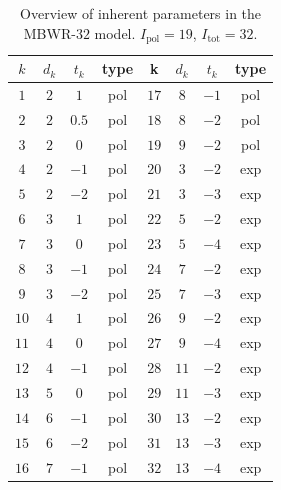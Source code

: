 \documentclass[internal,english]{sintefmemo2012}
\numberwithin{equation}{section}
\begin{document}
\begin{table}
  \label{MBWR32Terms}
  \centering
  \begin{tabular}{c c c c | c c c c }
    $k$		        & $d_k$		& $t_k$		& type		& k		 & $d_k$	  & $t_k$	    & type	       \\
    \hline
    $1$		        & $2$       	&$ 1$		& pol           & $17$	 & $8$       	  &$-1$		    & pol              \\
    $2$		        & $2$       	&$ 0.5$		&pol            & $18$	 & $8$       	  &$-2$		    & pol              \\
    $3$		        & $2$       	&$ 0$		&pol            & $19$	 & $9$       	  &$-2$		    & pol              \\
    $4$		        & $2$       	&$-1$ 		&pol            & $20$	 & $3$       	  &$-2$		    & exp              \\
    $5$		        & $2$       	&$-2$ 		&pol            & $21$	 & $3$       	  &$-3$		    & exp              \\
    $6$		        & $3$       	&$ 1$		&pol            & $22$	 & $5$       	  &$-2$		    & exp              \\
    $7$		        & $3$       	&$ 0$		&pol            & $23$	 & $5$       	  &$-4$		    & exp              \\
    $8$		        & $3$       	&$-1$		&pol            & $24$	 & $7$       	  &$-2$		    & exp              \\
    $9$		        & $3$       	&$-2$		&pol            & $25$	 & $7$       	  &$-3$		    & exp              \\
    $10$		& $4$       	&$ 1$		&pol            & $26$	 & $9$        	  &$-2$		    & exp              \\
    $11$		& $4$       	&$ 0$		&pol            & $27$   & $9$            &$-4$             & exp              \\
    $12$		& $4$       	&$-1$		&pol            & $28$   & $11$           &$-2$             & exp              \\
    $13$		& $5$       	&$ 0$		&pol            & $29$   & $11$           &$-3$             & exp              \\
    $14$		& $6$       	&$-1$		&pol            & $30$   & $13$           &$-2$             & exp              \\
    $15$		& $6$       	&$-2$		&pol            & $31$   & $13$           &$-3$             & exp              \\
    $16$		& $7$       	&$-1$		&pol            & $32$   & $13$           &$-4$             & exp              
  \end{tabular}
  \caption{Overview of inherent parameters in the MBWR-$32$ model. $I_{\mathrm{pol}}=19$, $I_{\mathrm{tot}}=32$.}
\end{table}
\end{document}
